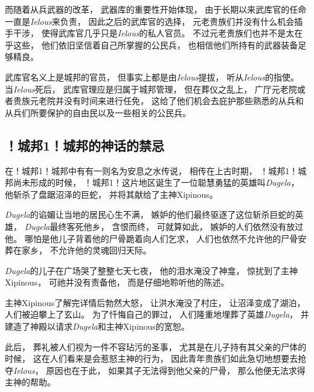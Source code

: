 \documentclass[12pt, a4paper]{ctexart}
\begin{document}
        而随着从兵武器的改革，
        武器库的重要性开始体现，
        由于长期以来武库官的任命一直是\emph{Ielous}来负责，
        因此之后的武库官的选择，
        元老贵族们并没有什么机会插手干涉，
        使得武库官几乎只是\emph{Ielous}的私人官员。
        不过元老贵族们也并不是太在乎这些，
        他们依旧坚信着自己所掌握的公民兵，
        也相信他们所持有的武器装备足够精良。

        武库官名义上是城邦的官员，
        但事实上都是由\emph{Ielous}提拔，
        听从\emph{Ielous}的指使。
        当\emph{Ielous}死后，
        武库官理应是归属于城邦管理，
        但在葬仪之乱上，
        广厅元老院或者贵族元老院并没有时间来进行任免，
        这给了他们机会去庇护那些熟悉的从兵和从兵们所要保护的自由民以及一些相关的公民兵。
    \subsection{！城邦1！城邦的神话的禁忌}
        在！城邦1！城邦中有有一则名为安息之水传说，
        相传在上古时期，
        ！城邦1！城邦尚未形成的时候，
        ！城邦1！这片地区诞生了一位聪慧勇猛的英雄叫\emph{Dugela}，
        他斩杀了盘踞沼泽的巨蛇，
        并将其献给了主神Xipinous。

        \emph{Dugela}的谄媚让当地的居民心生不满，
        嫉妒的他们最终驱逐了这位斩杀巨蛇的英雄，
        \emph{Dugela}最终客死他乡，
        含恨而终，
        可就算如此，
        嫉妒的人们依然没有放过他。
        哪怕是他儿子背着他的尸骨跪着向人们乞求，
        人们也依然不允许他的尸骨安葬在家乡，
        不允许他的灵魂回归天际。

        \emph{Dugela}的儿子在广场哭了整整七天七夜，
        他的泪水淹没了神龛，
        惊扰到了主神Xipinous，
        可祂并没有责备他，
        而是仔细地聆听他的陈述。

        主神Xipinous了解完详情后勃然大怒，
        让洪水淹没了村庄，
        让沼泽变成了湖泊，
        人们被迫攀上了玄山。
        为了忏悔自己的罪过，
        人们隆重地埋葬了英雄\emph{Dugela}，
        并建造了神殿以请求\emph{Dugela}和主神Xipinous的宽恕。

        此后，
        葬礼被人们视为一件不容玷污的圣事，
        尤其是在儿子持有其父亲的尸体的时候，
        这在人们看来是会惹怒主神的行为，
        因此青年贵族们如此急切地想要去抢夺\emph{Ielous}，
        原因也在于此，
        如果其子无法得到他父亲的尸骨，
        那么他便无法求得主神的帮助。
        





        
\end{document}
